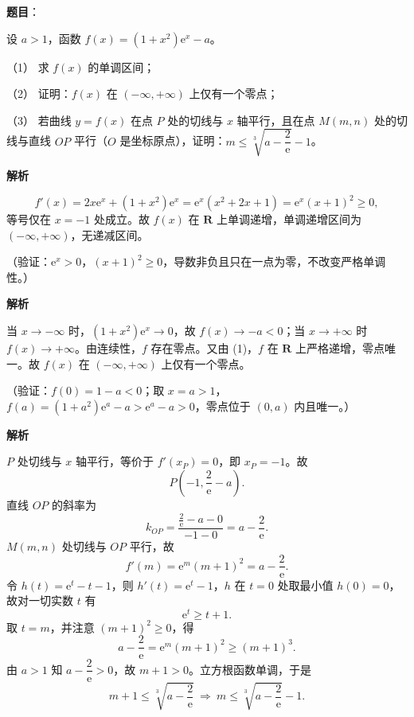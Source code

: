 \begin{answer}

\textbf{题目}：

设 \(a>1\)，函数 \(f(x)=(1+x^2)\mathrm{e}^x-a\)。

（1） 求 \(f(x)\) 的单调区间；

（2） 证明：\(f(x)\) 在 \((-\infty,+\infty)\) 上仅有一个零点；

（3） 若曲线 \(y=f(x)\) 在点 \(P\) 处的切线与 \(x\) 轴平行，且在点 \(M(m,n)\) 处的切线与直线 \(OP\) 平行（\(O\) 是坐标原点），证明：\(m\leqslant\sqrt[3]{a-\dfrac{2}{\mathrm{e}}}-1\)。

\textbf{解析}


\nopagebreak[4]
\[
f'(x)=2x\mathrm{e}^x+(1+x^2)\mathrm{e}^x
=\mathrm{e}^x(x^2+2x+1)=\mathrm{e}^x(x+1)^2\geqslant0,
\]
等号仅在 \(x=-1\) 处成立。故 \(f(x)\) 在 \(\mathbf{R}\) 上单调递增，单调递增区间为 \((-\infty,+\infty)\)，无递减区间。

（验证：\(\mathrm{e}^x>0\)，\((x+1)^2\geqslant0\)，导数非负且只在一点为零，不改变严格单调性。）


\textbf{解析}

当 \(x\to-\infty\) 时，\((1+x^2)\mathrm{e}^x\to0\)，故 \(f(x)\to-a<0\)；当 \(x\to+\infty\) 时 \(f(x)\to+\infty\)。由连续性，\(f\) 存在零点。又由 (1)，\(f\) 在 \(\mathbf{R}\) 上严格递增，零点唯一。故 \(f(x)\) 在 \((-\infty,+\infty)\) 上仅有一个零点。

（验证：\(f(0)=1-a<0\)；取 \(x=a>1\)，\(f(a)=(1+a^2)\mathrm{e}^a-a>\mathrm{e}^a-a>0\)，零点位于 \((0,a)\) 内且唯一。）


\textbf{解析}

\(P\) 处切线与 \(x\) 轴平行，等价于 \(f'(x_P)=0\)，即 \(x_P=-1\)。故
\nopagebreak[4]
\[
P\left(-1,\frac{2}{\mathrm{e}}-a\right).
\]
直线 \(OP\) 的斜率为
\nopagebreak[4]
\[
k_{OP}=\frac{\frac{2}{\mathrm{e}}-a-0}{-1-0}=a-\frac{2}{\mathrm{e}}.
\]
\(M(m,n)\) 处切线与 \(OP\) 平行，故
\nopagebreak[4]
\[
f'(m)=\mathrm{e}^m(m+1)^2=a-\frac{2}{\mathrm{e}}.
\]
令 \(h(t)=\mathrm{e}^t-t-1\)，则 \(h'(t)=\mathrm{e}^t-1\)，\(h\) 在 \(t=0\) 处取最小值 \(h(0)=0\)，故对一切实数 \(t\) 有
\nopagebreak[4]
\[
\mathrm{e}^t\geqslant t+1.
\]
取 \(t=m\)，并注意 \((m+1)^2\geqslant0\)，得
\nopagebreak[4]
\[
a-\frac{2}{\mathrm{e}}=\mathrm{e}^m(m+1)^2\geqslant(m+1)^3.
\]
由 \(a>1\) 知 \(a-\dfrac{2}{\mathrm{e}}>0\)，故 \(m+1>0\)。立方根函数单调，于是
\nopagebreak[4]
\[
m+1\leqslant\sqrt[3]{a-\frac{2}{\mathrm{e}}}
\ \Longrightarrow\
m\leqslant\sqrt[3]{a-\frac{2}{\mathrm{e}}}-1.
\]


\end{answer}

